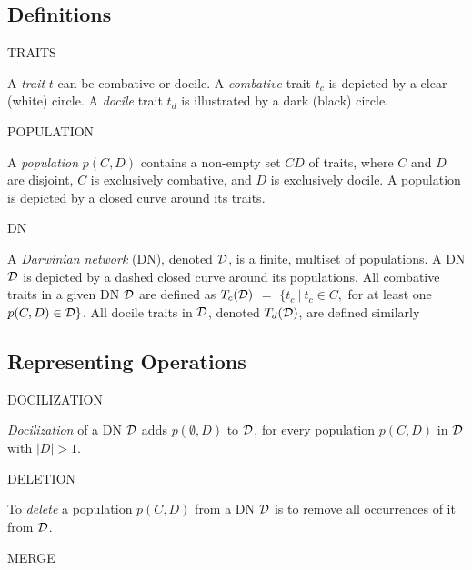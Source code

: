 \subsection{Definitions}
\label{subsec:definitions}

		TRAITS
		
		A \emph{trait} $t$ can be combative or docile.
		A \emph{combative} trait $t_c$ is depicted by a clear (white) circle.
		A \emph{docile} trait $t_d$ is illustrated by a dark (black) circle.

		POPULATION
		
		A \emph{population} $p(C,D)$ contains a non-empty set $CD$ of traits, where $C$ and $D$ are disjoint, $C$ is exclusively combative, and $D$ is exclusively docile.
		A population is depicted by a closed curve around its traits.


		DN
		
		A \emph{Darwinian network} (DN), denoted $\cal{D}$, is a finite, multiset of populations.
		A DN $\cal{D}$ is depicted by a dashed closed curve around its populations.
		All combative traits in a given DN $\cal{D}$ are defined as $T_c(\cal{D})$ $=$ $\{t_{c} ~ | ~ t_{c} \in C,$ for at least one $p(C,D) \in \cal{D}\}$.
		All docile traits in $\cal{D}$, denoted $T_d(\cal{D})$, are defined similarly

\subsection{Representing Operations}
\label{subsec:representing_operations}



		DOCILIZATION
		
		\emph{Docilization} of a DN $\cal{D}$ adds $p(\emptyset,D)$ to $\cal D$, for every population $p(C,D)$ in ${\cal D}$ with $|D| > 1$.

		DELETION
		
		To \emph{delete} a population $p(C,D)$ from a DN $\cal{D}$ is to remove all occurrences of it from $\cal{D}$.

		MERGE
		
